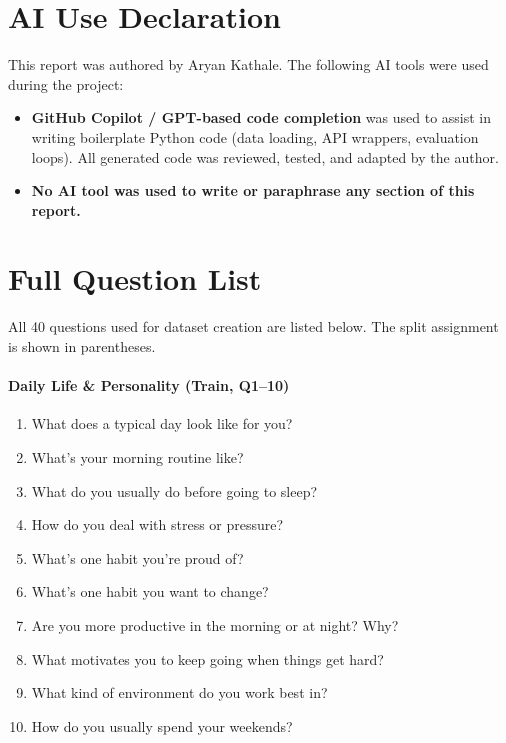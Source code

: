 \documentclass[11pt]{article}
\begin{document}
\section{AI Use Declaration}
This report was authored by Aryan Kathale.
The following AI tools were used during the project:

\begin{itemize}
  \item \textbf{GitHub Copilot / GPT-based code completion} was used to
        assist in writing boilerplate Python code (data loading, API
        wrappers, evaluation loops).
        All generated code was reviewed, tested, and adapted by the author.
  \item \textbf{No AI tool was used to write or paraphrase any section of
        this report.}
\end{itemize}



\appendix

\section{Full Question List}
\label{app:questions}

All 40 questions used for dataset creation are listed below.
The split assignment is shown in parentheses.

\paragraph{Daily Life \& Personality (Train, Q1--10)}
\begin{enumerate}
  \item What does a typical day look like for you?
  \item What's your morning routine like?
  \item What do you usually do before going to sleep?
  \item How do you deal with stress or pressure?
  \item What's one habit you're proud of?
  \item What's one habit you want to change?
  \item Are you more productive in the morning or at night? Why?
  \item What motivates you to keep going when things get hard?
  \item What kind of environment do you work best in?
  \item How do you usually spend your weekends?
\end{enumerate}
\end{document}
